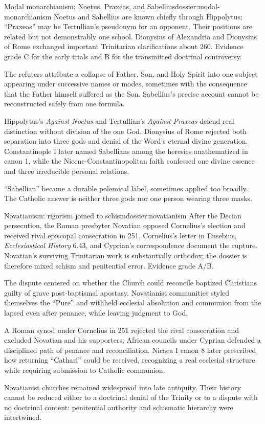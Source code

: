 \begin{heresydossier}{Modal monarchianism: Noetus, Praxeas, and Sabellius}{dossier:modal-monarchianism}
\objectfield Noetus and Sabellius are known chiefly through Hippolytus; ``Praxeas'' may be Tertullian's pseudonym for an opponent. Their positions are related but not demonstrably one school. Dionysius of Alexandria and Dionysius of Rome exchanged important Trinitarian clarifications about 260. Evidence grade C for the early trials and B for the transmitted doctrinal controversy.

\propositionfield The refuters attribute a collapse of Father, Son, and Holy Spirit into one subject appearing under successive names or modes, sometimes with the consequence that the Father himself suffered as the Son. Sabellius's precise account cannot be reconstructed safely from one formula.

\responsefield Hippolytus's \emph{Against Noetus} and Tertullian's \emph{Against Praxeas} defend real distinction without division of the one God. Dionysius of Rome rejected both separation into three gods and denial of the Word's eternal divine generation. Constantinople I later named Sabellians among the heresies anathematized in canon 1, while the Nicene-Constantinopolitan faith confessed one divine essence and three irreducible personal relations.

\aftermathfield ``Sabellian'' became a durable polemical label, sometimes applied too broadly. The Catholic answer is neither three gods nor one person wearing three masks.
\end{heresydossier}

\begin{heresydossier}{Novatianism: rigorism joined to schism}{dossier:novatianism}
\objectfield After the Decian persecution, the Roman presbyter Novatian opposed Cornelius's election and received rival episcopal consecration in 251. Cornelius's letter in Eusebius, \emph{Ecclesiastical History} 6.43, and Cyprian's correspondence document the rupture. Novatian's surviving Trinitarian work is substantially orthodox; the dossier is therefore mixed schism and penitential error. Evidence grade A/B.

\propositionfield The dispute centered on whether the Church could reconcile baptized Christians guilty of grave post-baptismal apostasy. Novatianist communities styled themselves the ``Pure'' and withheld ecclesial absolution and communion from the lapsed even after penance, while leaving judgment to God.

\responsefield A Roman synod under Cornelius in 251 rejected the rival consecration and excluded Novatian and his supporters; African councils under Cyprian defended a disciplined path of penance and reconciliation. Nicaea I canon 8 later prescribed how returning ``Cathari'' could be received, recognizing a real ecclesial structure while requiring submission to Catholic communion.

\aftermathfield Novatianist churches remained widespread into late antiquity. Their history cannot be reduced either to a doctrinal denial of the Trinity or to a dispute with no doctrinal content: penitential authority and schismatic hierarchy were intertwined.
\end{heresydossier}

